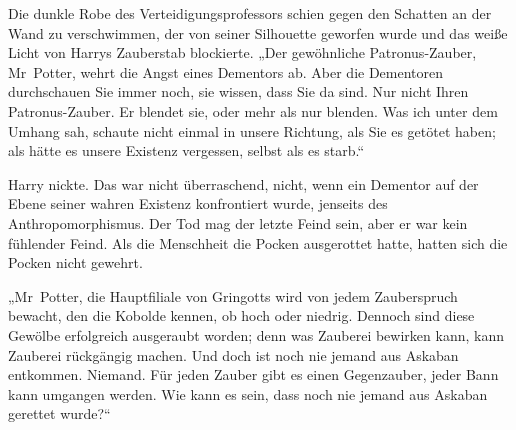 Die dunkle Robe des Verteidigungsprofessors schien gegen den Schatten an der Wand zu verschwimmen, der von seiner Silhouette geworfen wurde und das weiße Licht von Harrys Zauberstab blockierte.
„Der gewöhnliche Patronus-Zauber, Mr~Potter, wehrt die Angst eines Dementors ab. Aber die Dementoren durchschauen Sie immer noch, sie wissen, dass Sie da sind. Nur nicht Ihren Patronus-Zauber. Er blendet sie, oder mehr als nur blenden. Was ich unter dem Umhang sah, schaute nicht einmal in unsere Richtung, als Sie es getötet haben; als hätte es unsere Existenz vergessen, selbst als es starb.“

Harry nickte. Das war nicht überraschend, nicht, wenn ein Dementor auf der Ebene seiner wahren Existenz konfrontiert wurde, jenseits des Anthropomorphismus. Der Tod mag der letzte Feind sein, aber er war kein fühlender Feind. Als die Menschheit die Pocken ausgerottet hatte, hatten sich die Pocken nicht gewehrt.

„Mr~Potter, die Hauptfiliale von Gringotts wird von jedem Zauberspruch bewacht, den die Kobolde kennen, ob hoch oder niedrig. Dennoch sind diese Gewölbe erfolgreich ausgeraubt worden; denn was Zauberei bewirken kann, kann Zauberei rückgängig machen. Und doch ist noch nie jemand aus Askaban entkommen. Niemand. Für jeden Zauber gibt es einen Gegenzauber, jeder Bann kann umgangen werden. Wie kann es sein, dass noch nie jemand aus Askaban gerettet wurde?“

